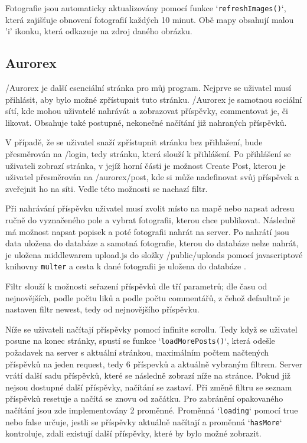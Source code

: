 Fotografie jsou automaticky aktualizovány pomocí funkce `\texttt{refreshImages()}`, která zajišťuje obnovení fotografií každých 10 minut. Obě mapy obsahují malou 'i' ikonku, která odkazuje na zdroj daného obrázku.

\subsection{Aurorex}

\par /Aurorex je další esenciální stránka pro můj program. Nejprve se uživatel musí přihlásit, aby bylo možné zpřístupnit tuto stránku. /Aurorex je samotnou sociální sítí, kde mohou uživatelé nahrávát a zobrazovat příspěvky, commentovat je, či likovat. Obsahuje také postupné, nekonečné načítání již nahraných příspěvků.
\par V případě, že se uživatel snaží zpřístupnit stránku bez přihlašení, bude přesměrován na /login, tedy stránku, která slouží k přihlášení. Po přihlášení se uživateli zobrazí stránka, v jejíž horní části je možnost Create Post, kterou je uživatel přesměrován na /aurorex/post, kde si může nadefinovat svůj příspěvek a zveřejnit ho na síti. Vedle této možnosti se nachazí filtr.
\par Při nahrávání příspěvku uživatel musí zvolit místo na mapě nebo napsat adresu ručně do vyznačeného pole a vybrat fotografii, kterou chce publikovat. Následně má možnost napsat popisek a poté fotografii nahrát na server. Po nahrátí jsou data uložena do databáze a samotná fotografie, kterou do databáze nelze nahrát, je uložena middlewarem upload.js do složky /public/uploads pomocí javascriptové knihovny \texttt{multer} a cesta k dané fotografii je uložena do databáze \cite{multer_file_upload} \cite{multer_file_upload_tutorial} \cite{multer_npm}. 
\par Filtr slouží k možnosti seřazení příspěvků dle tří parametrů; dle času od nejnovějších, podle počtu liků a podle počtu commentářů, z čehož defaultně je nastaven filtr newest, tedy od nejnovějšího příspěvku.
\par Níže se uživateli načítají příspěvky pomocí infinite scrollu. Tedy když se uživatel posune na konec stránky, spustí se funkce `\texttt{loadMorePosts()}`, která odešle požadavek na server s aktuální stránkou, maximálním počtem načtených příspěvků na jeden request, tedy 6 příspevků a aktuálně vybraným filtrem. Server vrátí další sadu příspěvků, které se následně zobrazí níže na stránce. Pokud již nejsou dostupné další příspěvky, načítání se zastaví. Při změně filtru se seznam příspěvků resetuje a načítá se znovu od začátku. Pro zabránění opakovaného načítání jsou zde implementovány 2 proměnné. Proměnná `\texttt{loading}` pomocí true nebo false určuje, jestli se příspěvky aktuálně načítají a proměnná `\texttt{hasMore}` kontroluje, zdali existují další příspěvky, které by bylo možné zobrazit.
